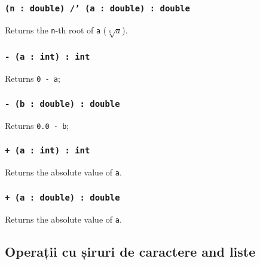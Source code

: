 \subsubsection{\texttt{(n : double) /' (a : double) : double}}

Returns the \texttt{n}-th root of \texttt{a} ($\sqrt[n]{a}$).


\subsubsection{\texttt{- (a : int) : int}}

Returns \texttt{0 - a};

\subsubsection{\texttt{- (b : double) : double}}

Returns \texttt{0.0 - b};

\subsubsection{\texttt{+ (a : int) : int}}

Returns the absolute value of \texttt{a}.

\subsubsection{\texttt{+ (a : double) : double}}

Returns the absolute value of \texttt{a}.

\subsection{Operații cu șiruri de caractere and liste}

